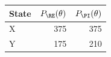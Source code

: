\begin{tabular}{lrr}
\toprule
State & $P_{\RE}(\theta)$ & $P_{\PI}(\theta)$ \\
\midrule
X & 375 & 375 \\
Y & 175 & 210 \\
\bottomrule
\end{tabular}
